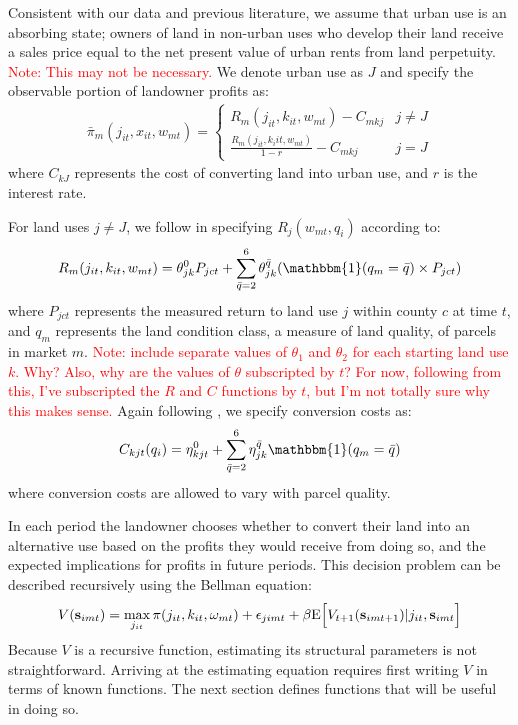 \documentclass[11pt]{article}
\newcommand{\Exp}{\textnormal{E}}
\begin{document}
Consistent with our data and previous literature, we assume that urban use is an absorbing state; owners of land in non-urban uses who develop their land receive a sales price equal to the net present value of urban rents from land perpetuity. \textcolor{red}{Note: This may not be necessary.} We denote urban use as $J$ and specify the observable portion of landowner profits as:
\begin{align} \label{eq:pidefn}
\bar{\pi}_m(j_{it},x_{it},w_{mt}) = \left\{\begin{array}{ll} 
	R_{m}(j_{it},k_{it}, w_{mt}) - C_{mkj} & j\neq J \\
	\frac{R_{m}(j_{it},k_i{it}, w_{mt})}{1-r} - C_{mkj} & j = J
	\end{array}\right.
\end{align}
where $C_{kJ}$ represents the cost of converting land into urban use, and $r$ is the interest rate.

For land uses $j \neq J$, we follow \citet{lubowski2006} in specifying $R_{j}(w_{mt},q_{i})$ according to:
\begin{align} \label{eq:rentspec}
R_{m}(j_{it},k_{it}, w_{mt}) = \theta^0_{jk} P_{jct} + \sum_{\bar{q} = 2}^6 \theta^{\bar{q}}_{jk} (\mathbbm{1}(q_{m} = \bar{q}) \times P_{jct} )
\end{align}
where $P_{jct}$ represents the measured return to land use $j$ within county $c$ at time $t$, and $q_{m}$ represents the land condition class, a measure of land quality, of parcels in market $m$. \textcolor{red}{Note: \citet{lubowski2006} include separate values of $\theta_1$ and $\theta_2$ for each starting land use $k$. Why? Also, why are the values of $\theta$ subscripted by $t$? For now, following from this, I've subscripted the $R$ and $C$ functions by $t$, but I'm not totally sure why this makes sense.} Again following \citet{lubowski2006}, we specify conversion costs as: 
\begin{align} \label{eq:costspec}
C_{kjt}(q_i) = \eta^0_{kjt} + \sum_{\bar{q} = 2}^6 \eta^{\bar{q}}_{jk} \mathbbm{1}(q_{m} = \bar{q}) 
\end{align}
where conversion costs are allowed to vary with parcel quality.

In each period the landowner chooses whether to convert their land into an alternative use based on the profits they would receive from doing so, and the expected implications for profits in future periods. This decision problem can be described recursively using the Bellman equation:
\begin{align}
V({\bf s}_{imt}) = \max_{j_{it}} \pi(j_{it},k_{it},\omega_{mt}) + \epsilon_{jimt} + \beta \Exp\Big[V_{t+1}({\bf s}_{imt+1})|j_{it},{\bf s}_{imt}\Big]
\end{align}
Because $V$ is a recursive function, estimating its structural parameters is not straightforward. Arriving at the estimating equation requires first writing $V$ in terms of known functions. The next section defines functions that will be useful in doing so.
\end{document}

